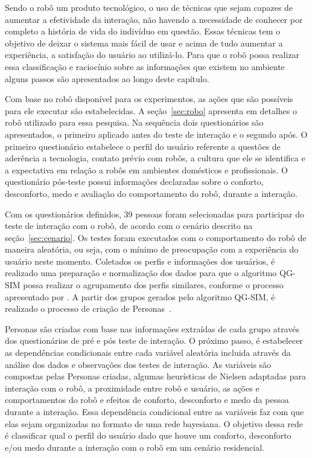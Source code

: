 Sendo o robô um produto tecnológico, o uso de técnicas que sejam capazes de aumentar a efetividade da interação, não havendo a necessidade de conhecer por completo a história de vida do indivíduo em questão. Essas técnicas tem o objetivo de deixar o sistema mais fácil de usar e acima de tudo aumentar a experiência, a satisfação do usuário ao utilizá-lo. Para que o robô possa realizar essa classificação e raciocínio sobre as informações que existem no ambiente alguns passos são apresentados ao longo deste capítulo.

Com base no robô disponível para os experimentos, as ações que são possíveis para ele executar são estabelecidas. A seção~\ref{sec:robo} apresenta em detalhes o robô utilizado para essa pesquisa. Na sequência dois questionários são apresentados, o primeiro aplicado antes do teste de interação e o segundo após. O primeiro questionário estabelece o perfil do usuário referente a questões de aderência a tecnologia, contato prévio com robôs, a cultura que ele se identifica e a expectativa em relação a robôs em ambientes domésticos e profissionais. O questionário pós-teste possui informações declaradas sobre o conforto, desconforto, medo e avaliação do comportamento do robô, durante a interação.

Com os questionários definidos, 39 pessoas foram selecionadas para participar do teste de interação com o robô, de acordo com o cenário descrito na seção~\ref{sec:cenario}. Os testes foram executados com o comportamento do robô de maneira aleatória, ou seja, com o mínimo de preocupação com a experiência do usuário neste momento. Coletados os perfis e informações dos usuários, é realizado uma preparação e normalização dos dados para que o algoritmo QG-SIM possa realizar o agrupamento dos perfis similares, conforme o processo apresentado por . A partir dos grupos gerados pelo algoritmo QG-SIM, é realizado o processo de criação de Personas~\cite{masiero:2013, masiero:2013b}.

Personas são criadas com base nas informações extraídas de cada grupo através dos questionários de pré e pós teste de interação. O próximo passo, é estabelecer as dependências condicionais entre cada variável aleatória incluida através da análise dos dados e observações dos testes de interação. As variáveis são compostas pelas Personas criadas, algumas heurísticas de Nielsen adaptadas para interação com o robô, a proximidade entre robô e usuário, as ações e comportamentos do robô e efeitos de conforto, desconforto e medo da pessoa durante a interação. Essa dependência condicional entre as variáveis faz com que elas sejam organizadas no formato de uma rede bayesiana. O objetivo dessa rede é classificar qual o perfil do usuário dado que houve um conforto, desconforto e/ou medo durante a interação com o robô em um cenário residencial.


